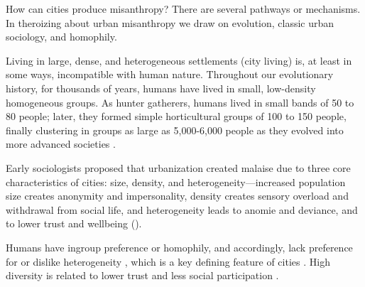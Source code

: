 \documentclass[11pt, letterpaper]{article}
\begin{document}
\begin{spacing}{1.4}
How can cities produce misanthropy? There are several pathways or
mechanisms. In theroizing about urban misanthropy we draw on evolution, classic
urban sociology, and homophily.  

Living in large, dense, and heterogeneous settlements (city living) is, at least
in some ways, incompatible with human nature. Throughout our evolutionary
history, for thousands of years, humans have lived in small, low-density
homogeneous groups. As hunter gatherers, humans lived in small bands of 50 to 80
people; later, they formed simple horticultural groups of 100 to 150 people,
finally clustering in groups as large as 5,000-6,000  people as they evolved
into more advanced societies \citep{maryanski92}.


Early sociologists  
 proposed that urbanization created malaise due to three core characteristics of cities: size, density, and heterogeneity---increased population size creates anonymity and
 impersonality, density creates sensory overload and withdrawal from social
 life, and heterogeneity leads to anomie and deviance, and to lower trust and wellbeing (\citet{park84,
   simmel03, tonnies57, wirth38,putnam07,aok_brfss_segregation15,herbst14,postmes02,vogt07,smelser99}).
%

Humans have ingroup preference or homophily, and
accordingly, lack preference for or dislike heterogeneity
\citep{smith14,mcpherson01,bleidorn16,putnam07}, which is a key defining feature
of cities \citep{wirth38,amin06,thrift05}. High diversity is related to lower trust and less social participation \citep{alesina99,alesina00,luttmer01,alesina02,rodriguez2019does}.  


\end{spacing}
\end{document}
